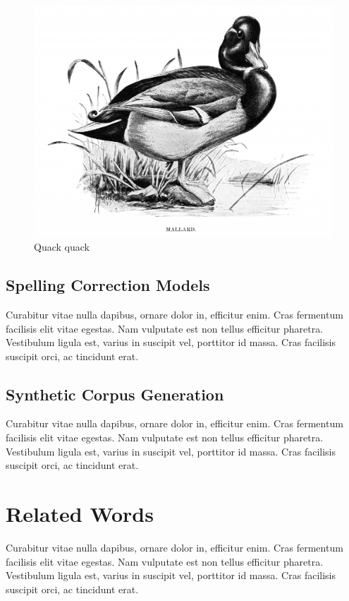 \documentclass[sigconf, nonacm]{acmart}
\begin{document}
\begin{figure}
  \centering
  \includegraphics[width=\linewidth]{figures/duck}
  \caption{Quack quack}
  \label{fig:duck}
\end{figure}

\subsection{Spelling Correction Models}

Curabitur vitae nulla dapibus, ornare dolor in, efficitur enim. Cras fermentum facilisis elit vitae egestas. Nam vulputate est non tellus efficitur pharetra. Vestibulum ligula est, varius in suscipit vel, porttitor id massa. Cras facilisis suscipit orci, ac tincidunt erat.

\subsection{Synthetic Corpus Generation}

Curabitur vitae nulla dapibus, ornare dolor in, efficitur enim. Cras fermentum facilisis elit vitae egestas. Nam vulputate est non tellus efficitur pharetra. Vestibulum ligula est, varius in suscipit vel, porttitor id massa. Cras facilisis suscipit orci, ac tincidunt erat.

\section{Related Words}
Curabitur vitae nulla dapibus, ornare dolor in, efficitur enim. Cras fermentum facilisis elit vitae egestas. Nam vulputate est non tellus efficitur pharetra. Vestibulum ligula est, varius in suscipit vel, porttitor id massa. Cras facilisis suscipit orci, ac tincidunt erat.
\end{document}
